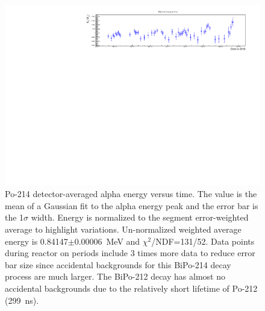 \FloatBarrier
\newpage
\begin{figure}[!h]
\centering
\includegraphics[width=1.05\textwidth]{figures/PubBiPo214EvsT.pdf}
\caption{\label{fig:EvsT214}Po-214 detector-averaged alpha energy versus time. The value is the mean of a Gaussian fit to the alpha energy peak and the error bar is the 1$\sigma$ width. Energy is normalized to the segment error-weighted average to highlight variations. Un-normalized weighted average energy is 0.84147$\pm$0.00006~MeV and $\chi^2$/NDF=131/52. Data points during reactor on periods include 3 times more data to reduce error bar size since accidental backgrounds for this BiPo-214 decay process are much larger. The BiPo-212 decay has almost no accidental backgrounds due to the relatively short lifetime of Po-212 (299~ns).}
\end{figure}
